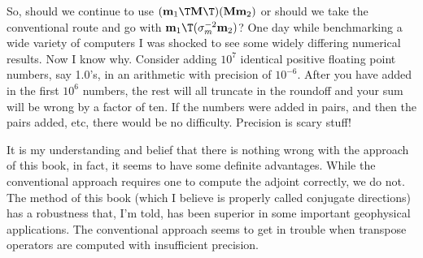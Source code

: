\par
So, should we continue to use
$(\bold m_1\T \bold M\T) (\bold M \bold m_2)$
or should we take the conventional route and go with
$\bold m_1\T (\bold\sigma_m^{-2} \bold m_2)$?
One day while benchmarking a wide variety of computers I was shocked
to see some widely differing numerical results.  Now I know why.
Consider adding $10^7$ identical positive floating point numbers, say 1.0's,
in an arithmetic with precision of $10^{-6}$.
After you have added in the first $10^6$ numbers,
the rest will all truncate in the roundoff
and your sum will be wrong by a factor of ten.
If the numbers were added in pairs,
and then the pairs added, etc, there would be no difficulty.
Precision is scary stuff!

\par
It is my understanding and belief that there is nothing wrong
with the approach of this book, in fact,
it seems to have some definite advantages.
While the conventional approach requires one
to compute the adjoint correctly, we do not.
The method of this book
(which I believe is properly called conjugate directions)
has a robustness that, I'm told,
has been superior in some important geophysical applications.
The conventional approach seems to get in trouble when
transpose operators are computed with insufficient precision.









